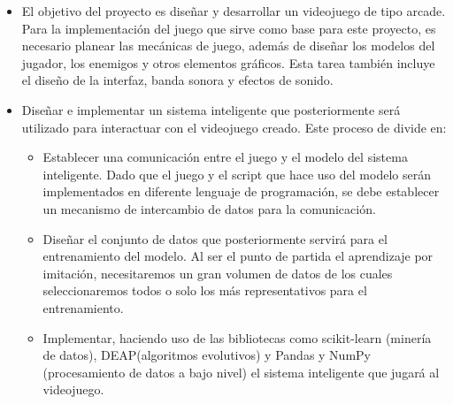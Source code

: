 
 
\begin{itemize}
    \item El objetivo del proyecto es diseñar y desarrollar un videojuego de tipo arcade. Para la implementación del juego que sirve como base para este proyecto, es necesario planear las mecánicas de juego, además de diseñar los modelos del jugador, los enemigos y otros elementos gráficos. Esta tarea también incluye el diseño de la interfaz, banda sonora y efectos de sonido. 
    
    \item Diseñar e implementar un sistema inteligente que posteriormente será utilizado para interactuar con el videojuego creado. Este proceso de divide en:
    \begin{itemize}
        \item Establecer una comunicación entre el juego y el modelo del sistema inteligente. Dado que el juego y el script que hace uso del modelo serán implementados en diferente lenguaje de programación, se debe establecer un mecanismo de intercambio de datos para la comunicación.
        \item Diseñar el conjunto de datos que posteriormente servirá para el entrenamiento del modelo. Al ser el punto de partida el aprendizaje por imitación, necesitaremos un gran volumen de datos de los cuales seleccionaremos todos o solo los más representativos para el entrenamiento.
        \item Implementar, haciendo uso de las bibliotecas como scikit-learn (minería de datos), DEAP(algoritmos evolutivos) y Pandas y NumPy (procesamiento de datos a bajo nivel) el sistema inteligente que jugará al videojuego.
    \end{itemize}
\end{itemize}
